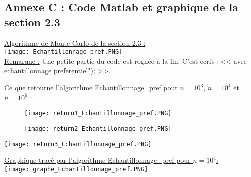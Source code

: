 \documentclass{article}
\theoremstyle{exostyle}
\begin{document}
\begin{appendices}

\setcounter{page}{1}
\section{Annexe C : Code Matlab et graphique de la section 2.3}

\bigbreak
\bigbreak

\hspace{-2.4cm}\underline{Algorithme de Monte Carlo de la section 2.3 :}\\

\hspace{-2.5cm}\texttt{[image: Echantillonnage\_pref.PNG]}\\

\hspace{-2.4cm}\underline{Remarque :} Une petite partie du code est rognée à la fin. C'est écrit : << avec echantillonnage preferentiel"); >>.

\newpage

\underline{Ce que retourne l'algorithme Echantillonnage\_pref pour $n = 10^{3}$, $n = 10^{4}$ et $n = 10^{6}$ :}

\begin{figure}[h]
    \begin{minipage}[c]{.46\linewidth}
        \centering
        \texttt{[image: return1\_Echantillonnage\_pref.PNG]}
    \end{minipage}
    \hfill
    \begin{minipage}[c]{.46\linewidth}
        \centering
        \texttt{[image: return2\_Echantillonnage\_pref.PNG]}
    \end{minipage}
\end{figure}


\texttt{[image: return3\_Echantillonnage\_pref.PNG]}

\newpage

\hspace{-1.7cm}\underline{Graphique tracé par l'algorithme Echantillonnage\_pref pour $n=10^{4}$:}\\

\hspace{-1.7cm}\texttt{[image: graphe\_Echantillonnage\_pref.PNG]}

\end{appendices}


\newpage
\end{document}

